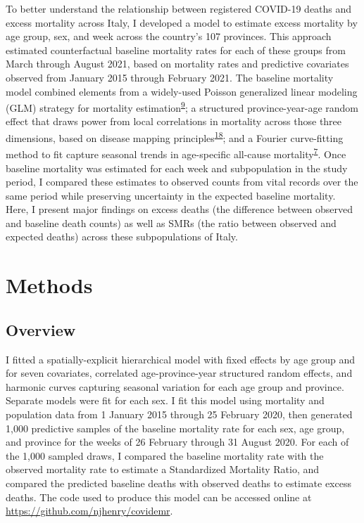 \documentclass[
]{article}
\begin{document}
To better understand the relationship between registered COVID-19 deaths and excess mortality across Italy, I developed a model to estimate excess mortality by age group, sex, and week across the country's 107 provinces. This approach estimated counterfactual baseline mortality rates for each of these groups from March through August 2021, based on mortality rates and predictive covariates observed from January 2015 through February 2021. The baseline mortality model combined elements from a widely-used Poisson generalized linear modeling (GLM) strategy for mortality estimation\textsuperscript{\protect\hyperlink{ref-Noufaily2013}{9}}⁠; a structured province-year-age random effect that draws power from local correlations in mortality across those three dimensions, based on disease mapping principles\textsuperscript{\protect\hyperlink{ref-Banerjee2014}{18}}⁠; and a Fourier curve-fitting method to fit capture seasonal trends in age-specific all-cause mortality\textsuperscript{\protect\hyperlink{ref-Serfling1963}{7}}⁠. Once baseline mortality was estimated for each week and subpopulation in the study period, I compared these estimates to observed counts from vital records over the same period while preserving uncertainty in the expected baseline mortality. Here, I present major findings on excess deaths (the difference between observed and baseline death counts) as well as SMRs (the ratio between observed and expected deaths) across these subpopulations of Italy.

\hypertarget{methods}{%
\section{Methods}\label{methods}}

\hypertarget{overview}{%
\subsection{Overview}\label{overview}}

I fitted a spatially-explicit hierarchical model with fixed effects by age group and for seven covariates, correlated age-province-year structured random effects, and harmonic curves capturing seasonal variation for each age group and province. Separate models were fit for each sex. I fit this model using mortality and population data from 1 January 2015 through 25 February 2020, then generated 1,000 predictive samples of the baseline mortality rate for each sex, age group, and province for the weeks of 26 February through 31 August 2020. For each of the 1,000 sampled draws, I compared the baseline mortality rate with the observed mortality rate to estimate a Standardized Mortality Ratio, and compared the predicted baseline deaths with observed deaths to estimate excess deaths. The code used to produce this model can be accessed online at \url{https://github.com/njhenry/covidemr}.
\end{document}
